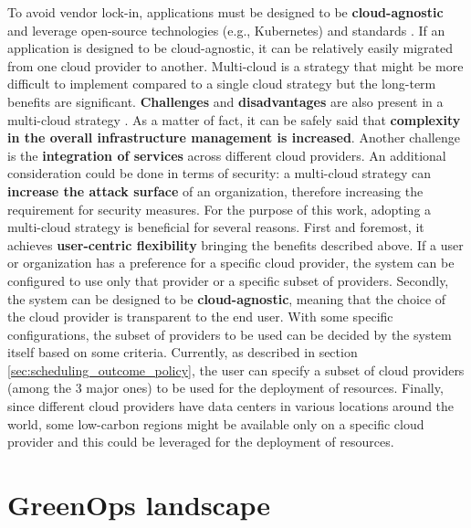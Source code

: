 To avoid vendor lock-in, applications must be designed to be \textbf{cloud-agnostic} and leverage open-source technologies (e.g., Kubernetes) and standards \cite{google_multicloud}.
If an application is designed to be cloud-agnostic, it can be relatively easily migrated from one cloud provider to another.
Multi-cloud is a strategy that might be more difficult to implement compared to a single cloud strategy but the long-term benefits are significant.
\textbf{Challenges} and \textbf{disadvantages} are also present in a multi-cloud strategy \cite{google_multicloud}.
As a matter of fact, it can be safely said that \textbf{complexity in the overall infrastructure management is increased}.
Another challenge is the \textbf{integration of services} across different cloud providers.
An additional consideration could be done in terms of security: a multi-cloud strategy can \textbf{increase the attack surface} of an organization, therefore increasing the requirement for security measures.
\newline
For the purpose of this work, adopting a multi-cloud strategy is beneficial for several reasons.
First and foremost, it achieves \textbf{user-centric flexibility} bringing the benefits described above.
If a user or organization has a preference for a specific cloud provider, the system can be configured to use only that provider or a specific subset of providers.
Secondly, the system can be designed to be \textbf{cloud-agnostic}, meaning that the choice of the cloud provider is transparent to the end user. 
With some specific configurations, the subset of providers to be used can be decided by the system itself based on some criteria.
Currently, as described in section \ref{sec:scheduling_outcome_policy}, the user can specify a subset of cloud providers (among the 3 major ones) to be used for the deployment of resources.
Finally, since different cloud providers have data centers in various locations around the world, some low-carbon regions might be available only on a specific cloud provider and this could be leveraged for the deployment of resources.

\section{GreenOps landscape}

